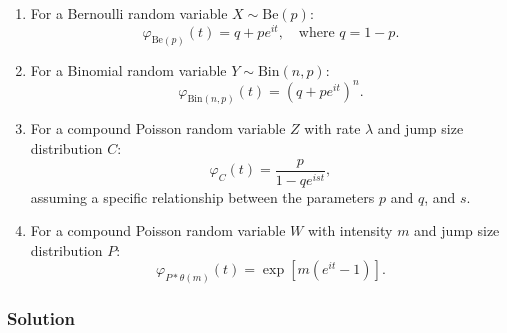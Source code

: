 \begin{enumerate}[label=(\alph*)]
    \item
    For a Bernoulli random variable \(X \sim \text{Be}(p)\):
    \[
    \varphi_{\text{Be}(p)}(t) = q + p e^{it}, \quad \text{where } q = 1-p.
    \]
    
    \item 
    
    For a Binomial random variable \(Y \sim \text{Bin}(n,p)\):
    \[
    \varphi_{\text{Bin}(n,p)}(t) = (q + p e^{it})^n.
    \]
    
    \item 
    
    For a compound Poisson random variable \(Z\) with rate \(\lambda\) and jump size distribution \(C\):
    \[
    \varphi_{C}(t) = \frac{p}{1 - q e^{ist}},
    \]
    assuming a specific relationship between the parameters \(p\) and \(q\), and \(s\).
    
    \item 
    
    For a compound Poisson random variable \(W\) with intensity \(m\) and jump size distribution \(P\):
    \[
    \varphi_{P \ast \theta(m)}(t) = \exp\left[m(e^{it} - 1)\right].
    \]
\end{enumerate}
\subsubsection*{Solution}

